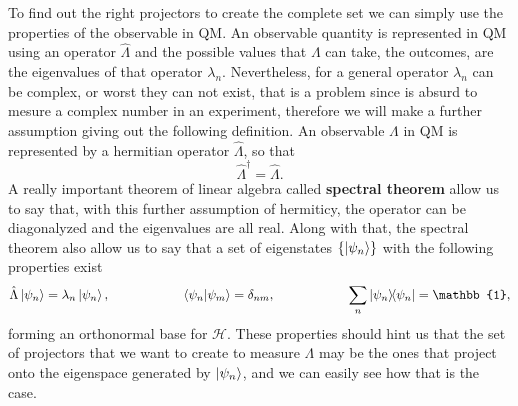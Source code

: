 To find out the right projectors to create the complete set we can simply use the properties of the observable in QM. An observable quantity is represented in QM using an operator $\hat{\Lambda}$ and the possible values that $\Lambda$ can take, the outcomes, are the eigenvalues of that operator $\lambda_n$. Nevertheless, for a general operator $\lambda_n$ can be complex, or worst they can not exist, that is a problem since is absurd to mesure a complex number in an experiment, therefore we will make a further assumption giving out the following definition.
{
    An observable $\Lambda$ in QM is represented by a hermitian operator $\hat{\Lambda}$, so that
    \begin{equation}
        \hat{\Lambda}^\dagger = \hat{\Lambda}.
    \end{equation}
}
\noindent
A really important theorem of linear algebra called \textbf{spectral theorem} allow us to say that, with this further assumption of hermiticy, the operator can be diagonalyzed and the eigenvalues are all real. Along with that, the spectral theorem also allow us to say that a set of eigenstates $\{\ket{\psi_n}\}$ with the following properties exist
\begin{equation}
    \label{eq:BaseDef}
    \hat{\Lambda}\ket{\psi_n} = \lambda_n\ket{\psi_n}, \hspace{2cm} \braket{\psi_n}{\psi_m} = \delta_{nm}, \hspace{2cm} \sum_n \ketbra{\psi_n}{\psi_n} = \mathbb{1},
\end{equation}
forming an orthonormal base for $\mathcal{H}$. These properties should hint us that the set of projectors that we want to create to measure $\Lambda$ may be the ones that project onto the eigenspace generated by $\ket{\psi_n}$, and we can easily see how that is the case. 

